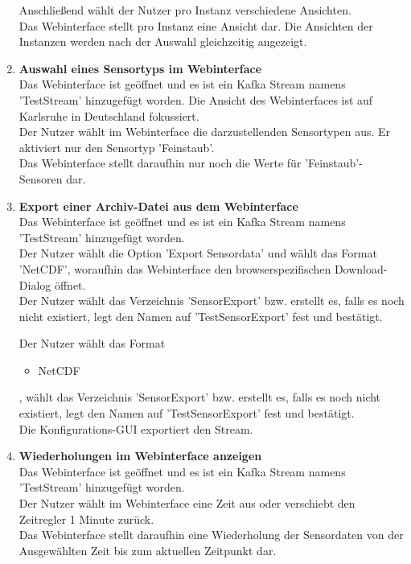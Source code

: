 \begin{enumerate}[label=\textbf{TI\arabic{enumi}0}]
		Anschließend wählt der Nutzer pro Instanz verschiedene Ansichten.\\
		Das Webinterface stellt pro Instanz eine Ansicht dar. Die Ansichten der Instanzen werden nach der Auswahl gleichzeitig angezeigt.
	\item \textbf{Auswahl eines Sensortyps im Webinterface}\\
		Das Webinterface ist geöffnet und es ist ein Kafka Stream namens 'TestStream' hinzugefügt worden. Die Ansicht des Webinterfaces ist auf Karlsruhe in Deutschland fokussiert.\\
		Der Nutzer wählt im Webinterface die darzustellenden Sensortypen aus. Er aktiviert nur den Sensortyp 'Feinstaub'.\\
		Das Webinterface stellt daraufhin nur noch die Werte für 'Feinstaub'-Sensoren dar.\par
	\item \textbf{Export einer Archiv-Datei aus dem Webinterface}\\
		Das Webinterface ist geöffnet und es ist ein Kafka Stream namens 'TestStream' hinzugefügt worden.\\
		Der Nutzer wählt die Option 'Export Sensordata' und wählt das Format 'NetCDF', woraufhin das Webinterface den browserspezifischen Download-Dialog öffnet.\\
		Der Nutzer wählt das Verzeichnis 'SensorExport' bzw. erstellt es, falls es noch nicht existiert, legt den Namen auf 'TestSensorExport' fest und bestätigt.\par
		
		Der Nutzer wählt das Format
		\begin{itemize}
		\item NetCDF
		\end{itemize}
		, wählt das Verzeichnis 'SensorExport' bzw. erstellt es, falls es noch nicht existiert, legt den Namen auf 'TestSensorExport' fest und bestätigt.\\
		Die Konfigurations-GUI exportiert den Stream.
	\item \textbf{Wiederholungen im Webinterface anzeigen}\\
		Das Webinterface ist geöffnet und es ist ein Kafka Stream namens 'TestStream' hinzugefügt worden.\\
		Der Nutzer wählt im Webinterface eine Zeit aus oder verschiebt den Zeitregler 1 Minute zurück. \\
		Das Webinterface stellt daraufhin eine Wiederholung der Sensordaten von der Ausgewählten Zeit bis zum aktuellen Zeitpunkt dar.\par
		

\end{enumerate}
